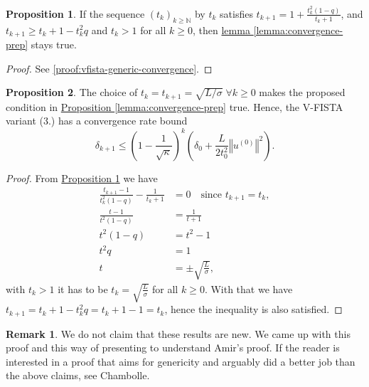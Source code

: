 \documentclass[]{article}
\theoremstyle{definition}
\newtheorem{prop}{Proposition}[section]         %
\newtheorem{remark}{Remark}[subsection]
{
    \newtheorem{assumption}{Assumption}
}
\numberwithin{equation}{subsection}
\begin{document}
        \begin{prop}\label{prop:vfista-generic-convergence}
            If the sequence $(t_k)_{k \ge \mathbb N}$ by $t_{k}$ satisfies 
            $t_{k + 1} = 1 + \frac{t_k^2(1 - q)}{t_k + 1}$, and $t_{k + 1} \ge t_k + 1 - t_k^2q$ and $t_k > 1$ for all $k\ge 0$, then \hyperref[lemma:convergence-prep]{lemma \ref*{lemma:convergence-prep}} stays true. 
        \end{prop}
        \begin{proof}
            See \hyperref[proof:vfista-generic-convergence]{\ref*{proof:vfista-generic-convergence}}. 
        \end{proof}
        \begin{prop}\label{prop:vfista-linear-convergence}
            The choice of $t_k = t_{k + 1} = \sqrt{L/\sigma}\; \forall k\ge 0$ makes the proposed condition in \hyperref[lemma:convergence-prep]{Proposition \ref*{lemma:convergence-prep}} true. 
            Hence, the V-FISTA variant (3.) has a convergence rate bound 
            \[
                \delta_{k + 1}
                \le 
                \left(
                    1 - \frac{1}{\sqrt{\kappa}}
                \right)^k\left(
                    \delta_0 + \frac{L}{2t_0^2}\left\Vert
                        u^{(0)}
                    \right\Vert^2
                \right).     
            \]
        \end{prop}
        \begin{proof}
            From \hyperref[prop:vfista-generic-convergence]{Proposition \ref*{prop:vfista-generic-convergence}} we have 
            \begin{align*}
                \frac{t_{k + 1} - 1}{t^2_k(1 - q)}
                    -
                \frac{1}{t_k + 1} &= 0
                \quad \text{since } t_{k + 1} = t_k, 
                \\
                \frac{t - 1}{t^2(1 - q)} &= \frac{1}{t + 1}
                \\
                t^2(1 - q) 
                &= t^2 - 1
                \\
                t^2q &= 1
                \\
                t &= \pm \sqrt{\frac{L}{\sigma}}, 
            \end{align*}
            with $t_k > 1$ it has to be $t_k = \sqrt{\frac{L}{\sigma}}$ for all $k \ge 0$. 
            With that we have $t_{k + 1} = t_{k} + 1 - t_k^2 q = t_k + 1 - 1 = t_k$, hence the inequality is also satisfied. 
        \end{proof}
        \begin{remark}
            We do not claim that these results are new. 
            We came up with this proof and this way of presenting to understand Amir's proof\cite[10.7.7]{beck_first-order_nodate}. 
            If the reader is interested in a proof that aims for genericity and arguably did a better job than the above claims, see Chambolle\cite[Appendix B]{chambolle_introduction_2016}. 
        \end{remark}
        
\end{document}
